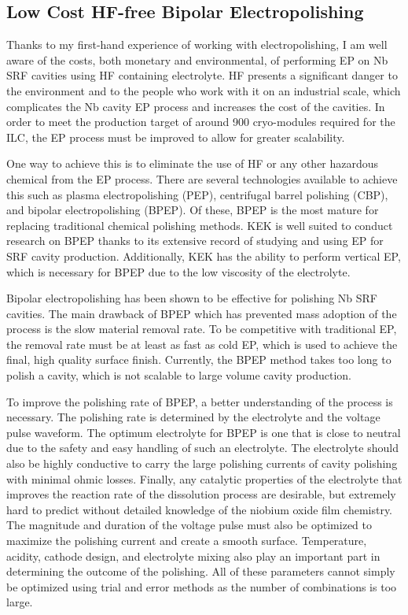 \documentclass[]{revtex4-2}
\begin{document}
\subsection{Low Cost HF-free Bipolar Electropolishing}

    Thanks to my first-hand experience of working with electropolishing, I am well aware of the costs, both monetary and environmental, of performing EP on Nb SRF cavities using HF containing electrolyte. HF presents a significant danger to the environment and to the people who work with it on an industrial scale, which complicates the Nb cavity EP process and increases the cost of the cavities. In order to meet the production target of around 900 cryo-modules required for the ILC, the EP process must be improved to allow for greater scalability.

    One way to achieve this is to eliminate the use of HF or any other hazardous chemical from the EP process. There are several technologies available to achieve this such as plasma electropolishing (PEP), centrifugal barrel polishing (CBP), and bipolar electropolishing (BPEP). Of these, BPEP is the most mature for replacing traditional chemical polishing methods. KEK is well suited to conduct research on BPEP thanks to its extensive record of studying and using EP for SRF cavity production. Additionally, KEK has the ability to perform vertical EP, which is necessary for BPEP due to the low viscosity of the electrolyte.

    Bipolar electropolishing has been shown to be effective for polishing Nb SRF cavities. The main drawback of BPEP which has prevented mass adoption of the process is the slow material removal rate. To be competitive with traditional EP, the removal rate must be at least as fast as cold EP, which is used to achieve the final, high quality surface finish. Currently, the BPEP method takes too long to polish a cavity, which is not scalable to large volume cavity production.

    To improve the polishing rate of BPEP, a better understanding of the process is necessary. The polishing rate is determined by the electrolyte and the voltage pulse waveform. The optimum electrolyte for BPEP is one that is close to neutral due to the safety and easy handling of such an electrolyte. The electrolyte should also be highly conductive to carry the large polishing currents of cavity polishing with minimal ohmic losses. Finally, any catalytic properties of the electrolyte that improves the reaction rate of the dissolution process are desirable, but extremely hard to predict without detailed knowledge of the niobium oxide film chemistry. The magnitude and duration of the voltage pulse must also be optimized to maximize the polishing current and create a smooth surface. Temperature, acidity, cathode design, and electrolyte mixing also play an important part in determining the outcome of the polishing. All of these parameters cannot simply be optimized using trial and error methods as the number of combinations is too large.
\end{document}
